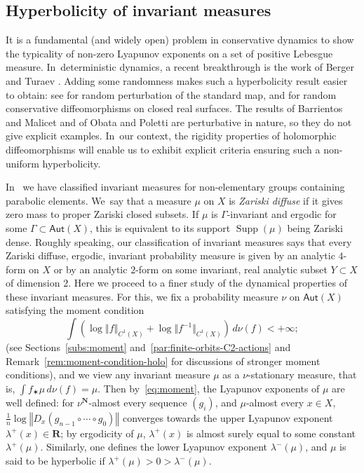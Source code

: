 \documentclass[11pt]{article}
\newcommand{\norm}[1]{{\left\Vert#1\right\Vert}}
\newcommand{\anorm}[1]{{\Vert#1\Vert}}
\newcommand{\lrpar}[1]{\left(#1\right)}
\newcommand{\inv}{^{-1}}
\DeclareMathOperator{\supp}{Supp}
\def\R{\mathbf{R}}
\def\N{\mathbf{N}}
\newcommand\Aut{\mathsf{Aut}}
\theoremstyle{plain}
\theoremstyle{definition}
\numberwithin{equation}{section}
\begin{document}
\subsection{Hyperbolicity of invariant measures} \label{subs:hyperbolicity}

It is a fundamental (and widely open) problem in conservative dynamics to show the typicality of non-zero Lyapunov exponents
on a set of positive Lebesgue measure. In~deterministic dynamics, a recent breakthrough is the work of
Berger and Turaev \cite{berger-turaev}. Adding some randomness makes such a hyperbolicity result easier to obtain:
see \cite{blumenthal-xue-young} for random perturbation of the standard map, and
\cite{barrientos-malicet, obata-poletti}
for random conservative diffeomorphisms on closed real surfaces. The results of Barrientos and Malicet \cite{barrientos-malicet} and of
Obata and Poletti \cite{obata-poletti} are perturbative in nature, so they do not give explicit examples. In~our context, the rigidity properties of holomorphic diffeomorphisms will
enable us to exhibit explicit criteria ensuring such a non-uniform hyperbolicity.

In~\cite{invariant} we have classified
invariant measures for non-elementary groups containing parabolic elements. We~say
that a measure $\mu$ on $X$ is
{\emph{Zariski diffuse}}
if it gives zero mass to proper Zariski closed subsets. If $\mu$ is $\Gamma$-invariant and ergodic for some
$\Gamma\subset \Aut(X)$, this is equivalent to its support $\supp(\mu)$
being Zariski dense. Roughly speaking, our classification of invariant measures says that every Zariski diffuse, ergodic, invariant probability measure is
given by an analytic $4$-form on $X$ or by an analytic $2$-form on some invariant, real analytic subset $Y\subset X$ of dimension $2$.
Here we proceed to a finer study of the dynamical properties of these invariant measures. For this, we
fix a probability measure $\nu$ on $\Aut(X)$ satisfying the moment condition
\begin{equation}\label{eq:moment}
\tag{M}
\int \lrpar{\log\norm{f}_{C^1(X)}+ \log\anorm{f\inv}_{C^1(X)}} \, d\nu (f) < + \infty;
\end{equation}
(see Sections~\ref{subs:moment} and~\ref{par:finite-orbits-C2-actions} and Remark~\ref{rem:moment-condition-holo} for discussions of stronger moment conditions),
and we view any invariant measure $\mu$
as a $\nu$-stationary measure, that is,
$\int f_\varstar\mu \, d\nu(f) = \mu$. Then by~\eqref{eq:moment},
the Lyapunov exponents of $\mu$ are well defined: for $\nu^\N$-almost every sequence $(g_i)$,
and $\mu$-almost every $x\in X$, $\frac{1}{n}\log \norm{D_x(g_{n-1}\circ \cdots \circ g_0)}$ converges towards the upper Lyapunov exponent $\lambda^+(x)\in \R$; by ergodicity of $\mu$, $\lambda^+(x)$ is almost surely equal to some constant $\lambda^+(\mu)$. Similarly, one defines the lower Lyapunov exponent $\lambda^-(\mu)$, and $\mu$ is said to be hyperbolic if $\lambda^+(\mu)>0>\lambda^-(\mu)$.
\end{document}
